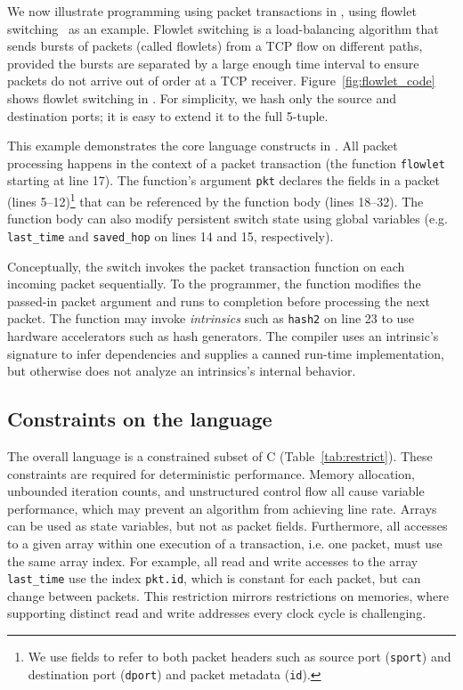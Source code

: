 We now illustrate programming using packet transactions in \pktlanguage, using
flowlet switching~\cite{flowlets} as an example. Flowlet switching is a
load-balancing algorithm that sends bursts of packets (called flowlets) from a
TCP flow on different paths, provided the bursts are separated by a large
enough time interval to ensure packets do not arrive out of order at a TCP
receiver. Figure~\ref{fig:flowlet_code} shows flowlet switching in
\pktlanguage. For simplicity, we hash only the source and destination ports; it
is easy to extend it to the full 5-tuple.

This example demonstrates the core language constructs in \pktlanguage. All
packet processing happens in the context of a packet transaction (the function
\texttt{flowlet} starting at line 17). The function's argument {\tt pkt}
declares the fields in a packet (lines 5--12)\footnote{We use fields to refer
to both packet headers such as source port ({\tt sport}) and destination port
({\tt dport}) and packet metadata ({\tt id}).} that can be referenced by the
function body (lines 18--32).  The function body can also modify persistent
switch state using global variables (e.g.  \texttt{last\_time} and
\texttt{saved\_hop} on lines 14 and 15, respectively).

Conceptually, the switch invokes the packet transaction function on each
incoming packet sequentially. To the programmer, the function modifies the
passed-in packet argument and runs to completion before processing the next
packet.  The function may invoke \textit{intrinsics} such as \texttt{hash2} on
line 23 to use hardware accelerators such as hash generators.  The \pktlanguage
compiler uses an intrinsic's signature to infer dependencies and supplies a
canned run-time implementation, but otherwise does not analyze an intrinsics's
internal behavior.

\subsection{Constraints on the language}

The overall language is a constrained subset of C (Table~\ref{tab:restrict}).
These constraints are required for deterministic performance.  Memory
allocation, unbounded iteration counts, and unstructured control flow all cause
variable performance, which may prevent an algorithm from achieving line rate.
Arrays can be used as state variables, but not as packet fields.  Furthermore,
all accesses to a given array within one execution of a transaction, i.e. one
packet, must use the same array index. For example, all read and write accesses
to the array \texttt{last\_time} use the index \texttt{pkt.id}, which is
constant for each packet, but can change between packets. This restriction
mirrors restrictions on memories, where supporting distinct read and write
addresses every clock cycle is challenging.


